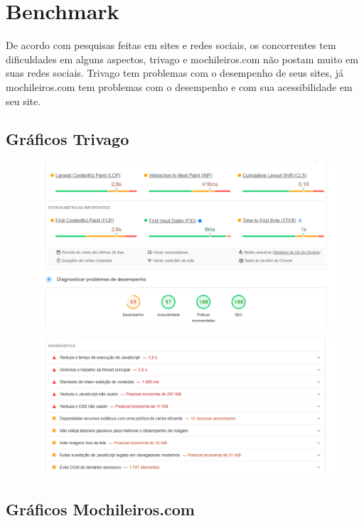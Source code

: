 \documentclass{article}
\begin{document}
\bigskip

\section{Benchmark}
De acordo com pesquisas feitas em sites e redes sociais, os concorrentes tem dificuldades em alguns aspectos, trivago e mochileiros.com não postam muito em suas redes sociais.
Trivago tem problemas com o desempenho de seus sites, já mochileiros.com tem problemas com o desempenho e com sua acessibilidade em seu site.

\subsection{Gráficos Trivago}

\begin{figure}[H]
      \centering
      \includegraphics [width=1\textwidth]{IMGDOC/AnaliseTrivago1.png}
      \label{pesq1 tri}
\end{figure}
\begin{figure}[H]
      \centering
      \includegraphics [width=1\textwidth]{IMGDOC/AnaliseTrivago2.png}
      \label{pesq2 tri}
\end{figure}

\subsection{Gráficos Mochileiros.com}
\end{document}
